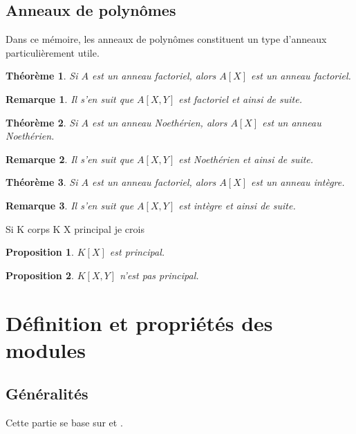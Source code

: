 \documentclass[a4paper,12pt]{report}  %
\theoremstyle{definitionstyle}
\theoremstyle{examplestyle}
\theoremstyle{remarkstyle}
\newtheorem{remark}{Remarque}[chapter] %
\theoremstyle{propositionstyle}
\newtheorem{proposition}{Proposition}[chapter]  %
\theoremstyle{theoremstyle}
\newtheorem{theoreme}{Théorème}[chapter]  %
\begin{document}
	\subsection{Anneaux de polynômes}
	
	Dans ce mémoire, les anneaux de polynômes constituent un type d'anneaux particulièrement utile.
	
	\begin{theoreme}
	Si $A$ est un anneau factoriel, alors $A[X]$ est un anneau factoriel.
	\end{theoreme}

	\begin{remark}
		Il s'en suit que $A[X, Y]$ est factoriel et ainsi de suite.
	\end{remark}

	\begin{theoreme}
		Si $A$ est un anneau Noethérien, alors $A[X]$ est un anneau Noethérien.
	\end{theoreme}
	
	\begin{remark}
		Il s'en suit que $A[X, Y]$ est Noethérien et ainsi de suite.
	\end{remark}

	\begin{theoreme}
		Si $A$ est un anneau factoriel, alors $A[X]$ est un anneau intègre.
	\end{theoreme}
	
	\begin{remark}
		Il s'en suit que $A[X, Y]$ est intègre et ainsi de suite.
	\end{remark}

	Si K corps K X principal je crois
	
	\begin{proposition}
		$K[X]$ est principal.
	\end{proposition}

	\begin{proposition}
		$K[X, Y]$ n'est pas principal.
	\end{proposition}
	
	\section{Définition et propriétés des modules} %
	
	\subsection{Généralités}
	Cette partie se base sur \cite{ring_modules} et \cite{harari_modules}.
	
\end{document}
